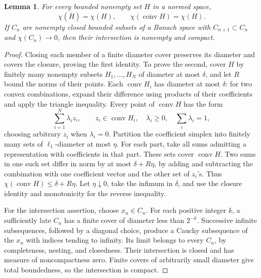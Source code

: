 \documentclass[11pt]{article}
\newtheorem{lemma}[theorem]{Lemma}
\theoremstyle{remark}
\newcommand{\co}{\operatorname{conv}}
\newcommand{\clco}{\overline{\operatorname{conv}}}
\begin{document}
\begin{lemma}\label{lem:chi}
For every bounded nonempty set $H$ in a normed space,
\[
\chi(\overline H)=\chi(H),\qquad
\chi(\clco H)=\chi(H).
\]
If $C_n$ are nonempty closed bounded subsets of a Banach space with $C_{n+1}\subset C_n$ and $\chi(C_n)\to0$, then their intersection is nonempty and compact.
\end{lemma}
\begin{proof}
Closing each member of a finite diameter cover preserves its diameter and covers the closure, proving the first identity. To prove the second, cover $H$ by finitely many nonempty subsets $H_1,\ldots,H_N$ of diameter at most $\delta$, and let $R$ bound the norms of their points. Each $\co H_i$ has diameter at most $\delta$: for two convex combinations, expand their difference using products of their coefficients and apply the triangle inequality. Every point of $\co H$ has the form
\[
\sum_{i=1}^N\lambda_i z_i,\qquad z_i\in\co H_i,
\quad\lambda_i\ge0,\quad\sum_i\lambda_i=1,
\]
choosing arbitrary $z_i$ when $\lambda_i=0$. Partition the coefficient simplex into finitely many sets of $\ell_1$-diameter at most $\eta$. For each part, take all sums admitting a representation with coefficients in that part. These sets cover $\co H$. Two sums in one such set differ in norm by at most $\delta+R\eta$, by adding and subtracting the combination with one coefficient vector and the other set of $z_i$'s. Thus $\chi(\co H)\le\delta+R\eta$. Let $\eta\downarrow0$, take the infimum in $\delta$, and use the closure identity and monotonicity for the reverse inequality.

For the intersection assertion, choose $x_n\in C_n$. For each positive integer $k$, a sufficiently late $C_n$ has a finite cover of diameter less than $2^{-k}$. Successive infinite subsequences, followed by a diagonal choice, produce a Cauchy subsequence of the $x_n$ with indices tending to infinity. Its limit belongs to every $C_n$, by completeness, nesting, and closedness. Their intersection is closed and has measure of noncompactness zero. Finite covers of arbitrarily small diameter give total boundedness, so the intersection is compact.
\end{proof}
\end{document}
